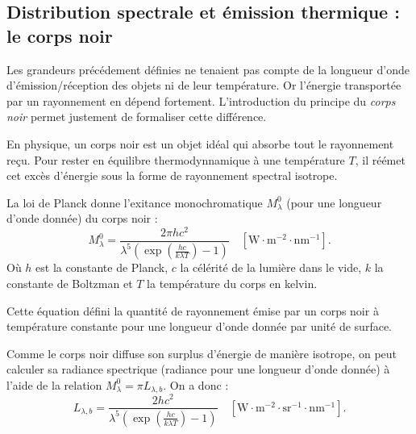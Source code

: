 

\subsection{Distribution spectrale et émission thermique : le corps noir}

Les grandeurs précédement définies ne tenaient pas compte de la longueur d'onde d'émission/réception des objets ni de leur température. Or l'énergie transportée par un rayonnement en dépend fortement. L'introduction du principe du \emph{corps noir} permet justement de formaliser cette différence. 

En physique, un corps noir est un objet idéal qui absorbe tout le rayonnement reçu. Pour rester en équilibre thermodynnamique à une température $T$, il réémet cet excès d'énergie sous la forme de rayonnement spectral isotrope. 

\begin{definition}
    La loi de Planck donne l'exitance monochromatique $M_\lambda^0$ (pour une longueur d'onde donnée) du corps noir : 
    \begin{equation}
        M_\lambda^0 = \frac{2 \pi h c^2}{ \lambda^5 \left( \exp \left( \frac{hc}{k \lambda T}\right) -1\right)} \quad [\mathrm{W} \cdot \mathrm{m}^{-2} \cdot \mathrm{nm}^{-1}]. 
    \end{equation}
    Où $h$ est la constante de Planck, $c$ la célérité de la lumière dans le vide, $k$ la constante de Boltzman et $T$ la température du corps en kelvin. 
\end{definition}

Cette équation défini la quantité de rayonnement émise par un corps noir à température constante pour une longueur d'onde donnée par unité de surface. 

\begin{proposition}
    Comme le corps noir diffuse son surplus d'énergie de manière isotrope, on peut calculer sa radiance spectrique (radiance pour une longueur d'onde donnée) à l'aide de la relation $ M_\lambda^0 = \pi L_{\lambda, b}$. On a donc : 
    \begin{equation}
        L_{\lambda, b} = \frac{2 h c^2}{ \lambda^5 \left( \exp \left( \frac{hc}{k \lambda T}\right) -1\right)} \quad [\mathrm{W} \cdot \mathrm{m}^{-2} \cdot \mathrm{sr}^{-1} \cdot \mathrm{nm}^{-1}]. 
    \end{equation}
\end{proposition}

